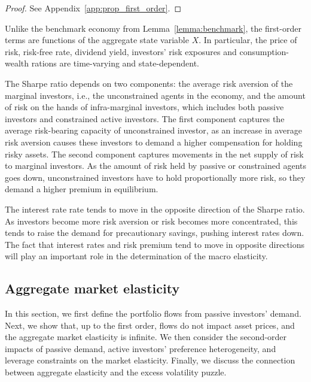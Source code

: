 \begin{proof}
See Appendix~\ref{app:prop_first_order}. 
\end{proof}
Unlike the benchmark economy from Lemma~\ref{lemma:benchmark}, the first-order terms are functions of the aggregate state variable $ X $. In particular, the price of risk, risk-free rate, dividend yield, investors' risk exposures and consumption-wealth rations are time-varying and state-dependent.

The Sharpe ratio depends on two components: the average risk aversion of the marginal investors, i.e., the unconstrained agents in the economy, and the amount of risk on the hands of infra-marginal investors, which includes both passive investors and constrained active investors. 
The first component captures the average risk-bearing capacity of unconstrained investor, as an increase in average risk aversion causes these investors to demand a higher compensation for holding risky assets.
The second component captures movements in the net supply of risk to marginal investors. 
As the amount of risk held by passive or constrained agents goes down, unconstrained investors have to hold proportionally more risk, so they demand a higher premium in equilibrium.

The interest rate rate tends to move in the opposite direction of the Sharpe ratio.
As investors become more risk aversion or risk becomes more concentrated, this tends to raise the demand for precautionary savings, pushing interest rates down. 
The fact that interest rates and risk premium tend to move in opposite directions will play an important role in the determination of the macro elasticity. 





\subsection{Aggregate market elasticity}
In this section, we first define the portfolio flows from passive investors' demand. Next, we show that, up to the first order, flows do not impact asset prices, and the aggregate market elasticity is infinite. We then consider the second-order impacts of passive demand, active investors' preference heterogeneity, and leverage constraints on the market elasticity. Finally, we discuss the connection between aggregate elasticity and the excess volatility puzzle.

